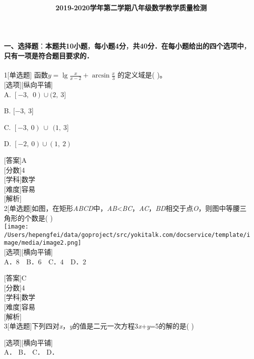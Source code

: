 \documentclass[a4paper,12pt,scale=0.8][UTF8]{ctexart}
\begin{document}
~~~~~~~~~~~~~~~\textbf{2019-2020学年第二学期八年级数学教学质量检测} \\
 \\
 \\
 \\
\textbf{一、选择题}：\textbf{本题共10小题}，\textbf{每小题4分}，\textbf{共40分．在每小题给出的四个选项中}，\textbf{只有一项是符合题目要求的．} \\
 \\
1{[}单选题{]}
函数\(y = \mathrm{\lg}\frac{x}{x - 2} + \mathrm{\arcsin}\frac{x}{3}\)
的定义域是( )。\\
{[}选项{]}{[}纵向平铺{]} \\ %
A. \(\left\lbrack - 3,\ \ 0 \right) \cup (2,\ 3\rbrack\)

B. \(\lbrack - 3,\ 3\rbrack\)

C. \(\left\lbrack - 3,\ 0 \right)\  \cup \ \ (1,\ 3\rbrack\)

D. \(\left\lbrack - 2,\ 0 \right) \cup (1,\ 2)\)

{[}答案{]}A \\
{[}分数{]}4 \\
{[}学科{]}数学 \\
{[}难度{]}容易 \\  %
{[}解析{]} \\
2{[}单选题{]}如图，在矩形\emph{ABCD}中，\emph{AB}\textless{}\emph{BC}，\emph{AC}，\emph{BD}相交于点\emph{O}，则图中等腰三角形的个数是( ) \\
\texttt{[image: /Users/hepengfei/data/goproject/src/yokitalk.com/docservice/template/image/media/image2.png]} \\

{[}选项{]}{[}横向平铺{]} \\ %
A．\(8\)~~B．\(6\)~~C．\(4\)~~D．\(2\)

{[}答案{]}C \\
{[}分数{]}4 \\
{[}学科{]}数学 \\
{[}难度{]}容易 \\  %
{[}解析{]} \\
3{[}单选题{]}下列四对\emph{x}，\emph{y}的值是二元一次方程3\emph{x}+\emph{y}=5的解的是( )

{[}选项{]}{[}横向平铺{]} \\ %
A． B． C． D．
\end{document}
